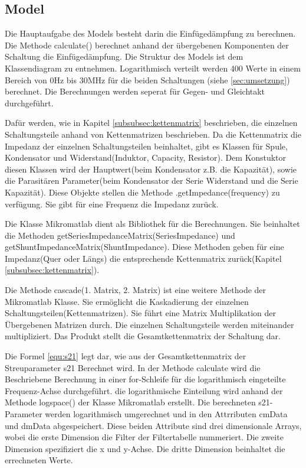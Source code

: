 \subsection{Model} \label{subsec:Model}
Die Hauptaufgabe des Models besteht darin die Einfügedämpfung zu berechnen. Die Methode calculate() berechnet anhand der übergebenen Komponenten der Schaltung die Einfügedämpfung. Die Struktur des Models ist dem Klassendiagram zu entnehmen. Logarithmisch verteilt werden 400 Werte in einem Bereich von 0Hz bis 30MHz für die beiden Schaltungen (siehe \ref{sec:umsetzung}) berechnet. Die Berechnungen werden seperat für Gegen- und Gleichtakt durchgeführt.

Dafür werden, wie in Kapitel \ref{subsubsec:kettenmatrix} beschrieben, die einzelnen Schaltungsteile anhand von Kettenmatrizen beschrieben. Da die Kettenmatrix die Impedanz der einzelnen Schaltungsteilen beinhaltet, gibt es Klassen für Spule, Kondensator und Widerstand(Induktor, Capacity, Resistor). Dem Konstuktor diesen Klassen wird der Hauptwert(beim Kondensator z.B. die Kapazität), sowie die Parasitären Parameter(beim Kondensator der Serie Widerstand und die Serie Kapazität). Diese Objekte stellen die Methode .getImpedance(frequency) zu verfügung. Sie gibt für eine Frequenz die Impedanz zurück.

Die Klasse Mikromatlab dient als Bibliothek für die Berechnungen. Sie beinhaltet die Methoden getSeriesImpedanceMatrix(SeriesImpedance) und getShuntImpedanceMatrix(ShuntImpedance). Diese Methoden geben für eine Impedanz(Quer oder Längs) die entsprechende Kettenmatrix zurück(Kapitel \ref{subsubsec:kettenmatrix}).

Die Methode cascade(1. Matrix, 2. Matrix) ist eine weitere Methode der Mikromatlab Klasse. Sie ermöglicht die Kaskadierung der einzelnen Schaltungsteilen(Kettenmatrizen). Sie führt eine Matrix Multiplikation der Übergebenen Matrizen durch. Die einzelnen Schaltungsteile werden miteinander multipliziert. Das Produkt stellt die Gesamtkettenmatrix der Schaltung dar. 

Die Formel \ref{equ:s21} legt dar, wie aus der Gesamtkettenmatrix der Streuparameter s21 Berechnet wird. In der Methode calculate wird die Beschriebene Berechnung in einer for-Schleife für die logarithmisch eingeteilte Frequenz-Achse durchgeführt. die logarithmische Einteilung wird anhand der Methode logspace() der Klasse Mikromatlab erstellt. Die berechneten s21-Parameter werden logarithmisch umgerechnet und in den Attrributen cmData und dmData abgespeichert. Diese beiden Attribute sind drei dimensionale Arrays, wobei die erste Dimension die Filter der Filtertabelle nummeriert. Die zweite Dimension spezifiziert die x und y-Achse. Die dritte Dimension beinhaltet die errechneten Werte. 

